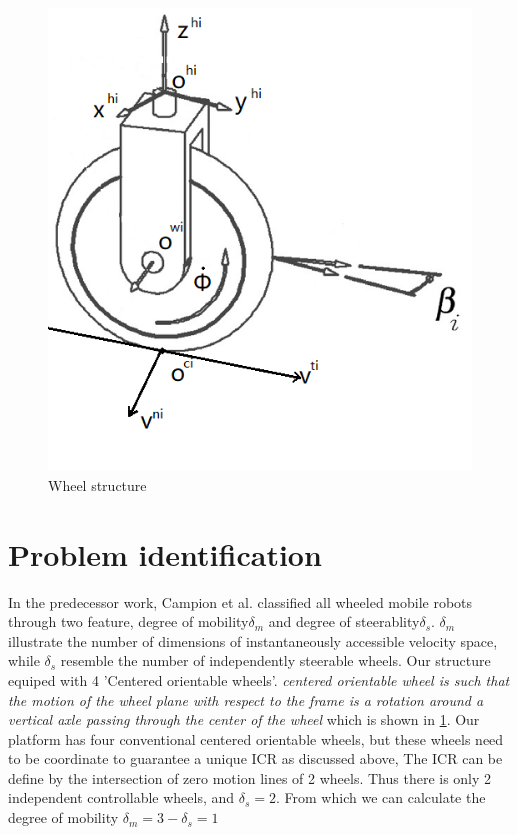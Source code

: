 \begin{figure}[t]
\begin{center}
\includegraphics[width=.5\textwidth]{../Figures/wheel.png}
\caption{Wheel structure}
\label{fig:wheel}
\end{center}
\end{figure}

\section{Problem identification}
\label{sec:problemIdentification}
In the predecessor work, Campion et al. classified all wheeled mobile robots through two feature, degree of mobility$\delta_m$ and degree of steerablity$\delta_s$. $\delta_m$ illustrate the number of dimensions of instantaneously accessible velocity space, while $\delta_s$ resemble the number of independently steerable wheels. Our structure equiped with 4 'Centered orientable wheels'. \textit{centered orientable wheel is such that the motion of the wheel plane with respect to the frame is a rotation around a vertical axle passing through the center of the wheel}\cite{campion1996structural} which is shown in \cref{fig:wheel}. Our platform has four conventional centered orientable wheels, but these wheels need to be coordinate to guarantee a unique ICR as discussed above, The ICR can be define by the intersection of zero motion lines of 2 wheels. Thus there is only 2 independent controllable wheels, and $\delta_s = 2$. From which we can calculate the degree of mobility $\delta_m = 3 - \delta_s = 1$ 

